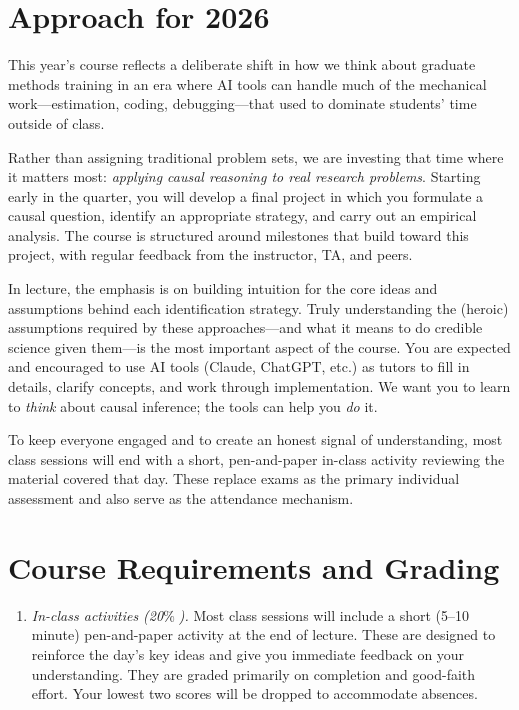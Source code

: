 \documentclass[PS]{syllabus}
\newcommand{\percent}{\ensuremath{\%\;}}
\begin{document}
\begin{syllabus}
\section*{Approach for 2026}

This year's course reflects a deliberate shift in how we think about graduate methods training in an era where AI tools can handle much of the mechanical work---estimation, coding, debugging---that used to dominate students' time outside of class.

Rather than assigning traditional problem sets, we are investing that time where it matters most: \textit{applying causal reasoning to real research problems}. Starting early in the quarter, you will develop a final project in which you formulate a causal question, identify an appropriate strategy, and carry out an empirical analysis. The course is structured around milestones that build toward this project, with regular feedback from the instructor, TA, and peers.

In lecture, the emphasis is on building intuition for the core ideas and assumptions behind each identification strategy. Truly understanding the (heroic) assumptions required by these approaches---and what it means to do credible science given them---is the most important aspect of the course. You are expected and encouraged to use AI tools (Claude, ChatGPT, etc.) as tutors to fill in details, clarify concepts, and work through implementation. We want you to learn to \textit{think} about causal inference; the tools can help you \textit{do} it.

To keep everyone engaged and to create an honest signal of understanding, most class sessions will end with a short, pen-and-paper in-class activity reviewing the material covered that day. These replace exams as the primary individual assessment and also serve as the attendance mechanism.

\section*{Course Requirements and Grading}

\begin{enumerate}

\item \emph{In-class activities (20\percent).} Most class sessions will include a short (5--10 minute) pen-and-paper activity at the end of lecture. These are designed to reinforce the day's key ideas and give you immediate feedback on your understanding. They are graded primarily on completion and good-faith effort. Your lowest two scores will be dropped to accommodate absences.


\end{enumerate}
\end{syllabus}
\end{document}

